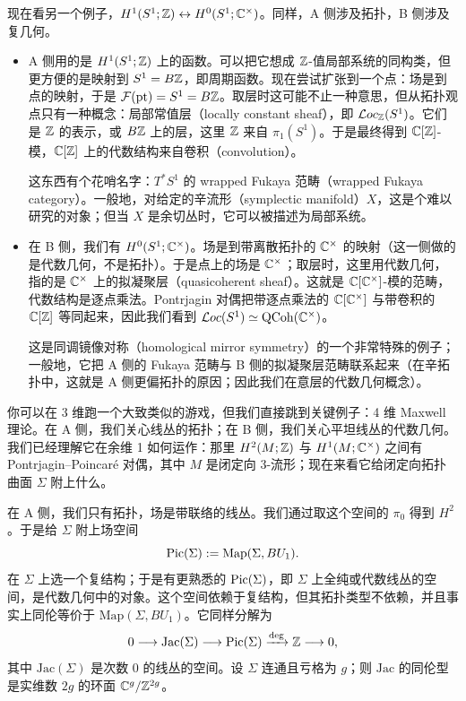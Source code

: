 现在看另一个例子，$H^1(S^1;\mathbb{Z})\leftrightarrow H^0(S^1;\mathbb{C}^\times)$。同样，A 侧涉及拓扑，B 侧涉及复几何。
\begin{itemize}
  \item A 侧用的是 $H^1(S^1;\mathbb{Z})$ 上的函数。可以把它想成 $\mathbb{Z}$-值局部系统的同构类，但更方便的是映射到 $S^1=B\mathbb{Z}$，即周期函数。现在尝试扩张到一个点：场是到点的映射，于是 $\mathcal{F}(\mathrm{pt})=S^1=B\mathbb{Z}$。取层时这可能不止一种意思，但从拓扑观点只有一种概念：局部常值层（locally constant sheaf），即 $\mathcal{L}oc_{\mathbb{Z}}(S^1)$。它们是 $\mathbb{Z}$ 的表示，或 $B\mathbb{Z}$ 上的层，这里 $\mathbb{Z}$ 来自 $\pi_1(S^1)$。于是最终得到 $\mathbb{C}[\mathbb{Z}]$-模，$\mathbb{C}[\mathbb{Z}]$ 上的代数结构来自卷积（convolution）。

  这东西有个花哨名字：$T^*S^1$ 的 wrapped Fukaya 范畴（wrapped Fukaya category）。一般地，对给定的辛流形（symplectic manifold）$X$，这是个难以研究的对象；但当 $X$ 是余切丛时，它可以被描述为局部系统。
  \item 在 B 侧，我们有 $H^0(S^1;\mathbb{C}^\times)$。场是到带离散拓扑的 $\mathbb{C}^\times$ 的映射（这一侧做的是代数几何，不是拓扑）。于是点上的场是 $\mathbb{C}^\times$；取层时，这里用代数几何，指的是 $\mathbb{C}^\times$ 上的拟凝聚层（quasicoherent sheaf）。这就是 $\mathbb{C}[\mathbb{C}^\times]$-模的范畴，代数结构是逐点乘法。Pontrjagin 对偶把带逐点乘法的 $\mathbb{C}[\mathbb{C}^\times]$ 与带卷积的 $\mathbb{C}[\mathbb{Z}]$ 等同起来，因此我们看到 $\mathcal{L}oc(S^1)\simeq \mathrm{QCoh}(\mathbb{C}^\times)$。

  这是同调镜像对称（homological mirror symmetry）的一个非常特殊的例子；一般地，它把 A 侧的 Fukaya 范畴与 B 侧的拟凝聚层范畴联系起来（在辛拓扑中，这就是 A 侧更偏拓扑的原因；因此我们在意层的代数几何概念）。
\end{itemize}

你可以在 3 维跑一个大致类似的游戏，但我们直接跳到关键例子：4 维 Maxwell 理论。在 A 侧，我们关心线丛的拓扑；在 B 侧，我们关心平坦线丛的代数几何。我们已经理解它在余维 1 如何运作：那里 $H^2(M;\mathbb{Z})$ 与 $H^1(M;\mathbb{C}^\times)$ 之间有 Pontrjagin–Poincaré 对偶，其中 $M$ 是闭定向 3-流形；现在来看它给闭定向拓扑曲面 $\Sigma$ 附上什么。

在 A 侧，我们只有拓扑，场是带联络的线丛。我们通过取这个空间的 $\pi_0$ 得到 $H^2$。于是给 $\Sigma$ 附上场空间
\[
  \operatorname{Pic}(\Sigma) := \mathrm{Map}(\Sigma, BU_1).
\]
在 $\Sigma$ 上选一个复结构；于是有更熟悉的 $\operatorname{Pic}(\Sigma)$，即 $\Sigma$ 上全纯或代数线丛的空间，是代数几何中的对象。这个空间依赖于复结构，但其拓扑类型不依赖，并且事实上同伦等价于 $\mathrm{Map}(\Sigma,BU_1)$。它同样分解为
\[
  0 \longrightarrow \mathrm{Jac}(\Sigma) \longrightarrow \operatorname{Pic}(\Sigma) \xrightarrow{\deg} \mathbb{Z} \longrightarrow 0,
\]
其中 $\mathrm{Jac}(\Sigma)$ 是次数 $0$ 的线丛的空间。设 $\Sigma$ 连通且亏格为 $g$；则 $\mathrm{Jac}$ 的同伦型是实维数 $2g$ 的环面 $\mathbb{C}^g/\mathbb{Z}^{2g}$。

